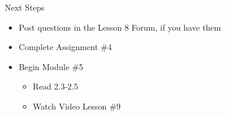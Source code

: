\documentclass{beamer}
\begin{document}
\begin{frame}[t]{Next Steps}
\begin{itemize}
\item Post questions in the Lesson 8 Forum, if you have them
\item Complete Assignment \#4
\item Begin Module \#5
\begin{itemize}
\item Read 2.3-2.5
\item Watch Video Lesson \#9
\end{itemize}
\end{itemize}
\end{frame}
\end{document}
